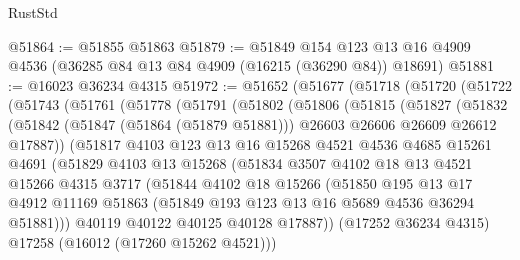 \begin{lexlean}{RustStd}
\begin{coremodule}
@51864 := @51855 @51863
@51879 := @51849
    @154
    @123
    @13
    @16
    @4909
    @4536
    (@36285 @84 @13 @84 @4909 (@16215 (@36290 @84)) @18691)
@51881 := @16023 @36234 @4315
@51972 := @51652
    (@51677
      (@51718
        (@51720
          (@51722
            (@51743
              (@51761
                (@51778
                  (@51791
                    (@51802
                      (@51806
                        (@51815
                          (@51827
                            (@51832
                              (@51842
                                (@51847 (@51864 (@51879 @51881)))
                                @26603
                                @26606
                                @26609
                                @26612
                                @17887))
                            (@51817
                              @4103
                              @123
                              @13
                              @16
                              @15268
                              @4521
                              @4536
                              @4685
                              @15261
                              @4691
                              (@51829
                                @4103
                                @13
                                @15268
                                (@51834
                                  @3507
                                  @4102
                                  @18
                                  @13
                                  @4521
                                  @15266
                                  @4315
                                  @3717
                                  (@51844
                                    @4102
                                    @18
                                    @15266
                                    (@51850
                                      @195
                                      @13
                                      @17
                                      @4912
                                      @11169
                                      @51863
                                      (@51849 @193 @123 @13 @16 @5689 @4536 @36294 @51881)))
                                  @40119
                                  @40122
                                  @40125
                                  @40128
                                  @17887))
                              (@17252 @36234 @4315)
                              @17258
                              (@16012 (@17260 @15262 @4521)))

\end{coremodule}
\end{lexlean}
